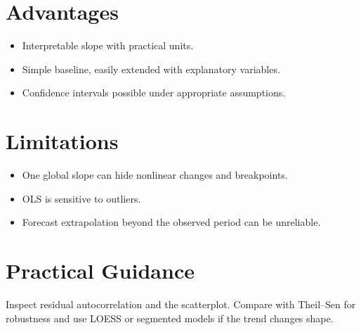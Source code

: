 \documentclass[a4paper]{article}
\begin{document}
\section{Advantages}
\begin{itemize}
 \item Interpretable slope with practical units.
 \item Simple baseline, easily extended with explanatory variables.
 \item Confidence intervals possible under appropriate assumptions.
\end{itemize}
\section{Limitations}
\begin{itemize}
 \item One global slope can hide nonlinear changes and breakpoints.
 \item OLS is sensitive to outliers.
 \item Forecast extrapolation beyond the observed period can be unreliable.
\end{itemize}
\section{Practical Guidance}
Inspect residual autocorrelation and the scatterplot. Compare with Theil--Sen for robustness and use LOESS or segmented models if the trend changes shape.



\end{document}
